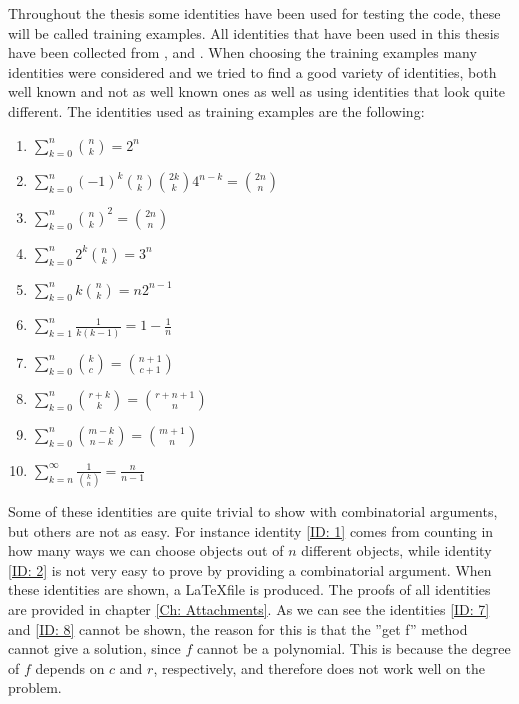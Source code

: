Throughout the thesis some identities have been used for testing the code, these will be called training examples. All identities that have been used in this thesis have been collected from , and . When choosing the training examples many identities were considered and we tried to find a good variety of identities, both well known and not as well known ones as well as using identities that look quite different. The identities used as training examples are the following:
\begin{enumerate}
  \item $\sum_{k=0}^n \binom{n}{k} = 2^n$ \label{ID: 1}
  \item $\sum_{k=0}^n (-1)^k\binom{n}{k}\binom{2k}{k}4^{n-k}=\binom{2n}{n}$ \label{ID: 2}
  \item $\sum_{k=0}^n \binom{n}{k}^2 = \binom{2n}{n}$ \label{ID: 3}
  \item $\sum_{k=0}^n 2^k\binom{n}{k} = 3^n$ \label{ID: 4}
  \item $\sum_{k=0}^n k\binom{n}{k} = n2^{n-1}$ \label{ID: 5}
  \item $\sum_{k=1}^n \frac{1}{k(k-1)} = 1-\frac{1}{n}$ \label{ID: 6}
  \item $\sum_{k=0}^n \binom{k}{c} = \binom{n+1}{c+1}$ \label{ID: 7}
  \item $\sum_{k=0}^n \binom{r+k}{k} = \binom{r+n+1}{n}$ \label{ID: 8}
  \item $\sum_{k=0}^n \binom{m-k}{n-k} = \binom{m+1}{n}$ \label{ID: 9}
  \item $\sum_{k=n}^\infty \frac{1}{\binom{k}{n}}=\frac{n}{n-1}$ \label{ID: 10}
\end{enumerate}
Some of these identities are quite trivial to show with combinatorial arguments, but others are not as easy. For instance identity \ref{ID: 1} comes from counting in how many ways we can choose objects out of $n$ different objects, while identity \ref{ID: 2} is not very easy to prove by providing a combinatorial argument. When these identities are shown, a \LaTeX file is produced. The proofs of all identities are provided in chapter \ref{Ch: Attachments}. As we can see the identities \ref{ID: 7} and \ref{ID: 8} cannot be shown, the reason for this is that the ''get f'' method cannot give a solution, since $f$ cannot be a polynomial. This is because the degree of $f$ depends on $c$ and $r$, respectively, and therefore \WZ does not work well on the problem.

